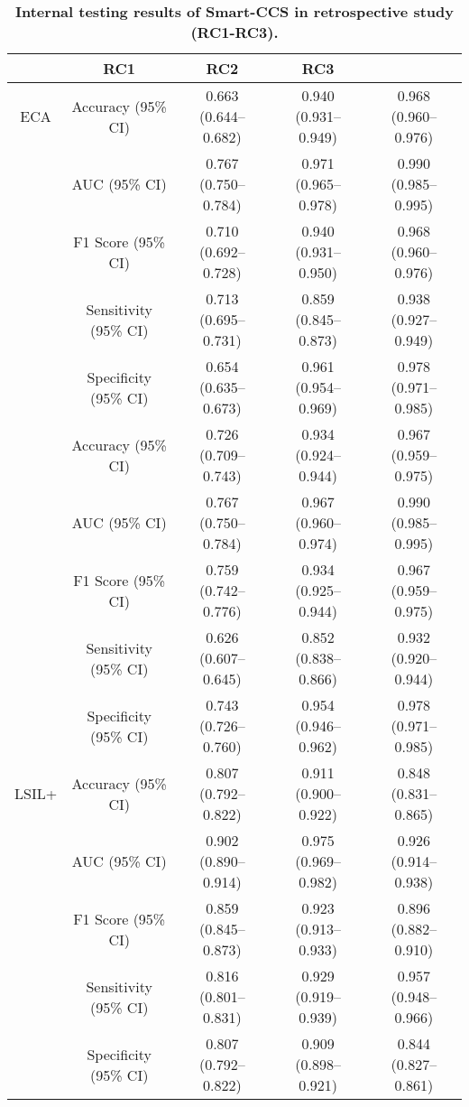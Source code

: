 \clearpage
\begin{table}[h] 
\renewcommand{\arraystretch}{2}
\renewcommand{\tablename}{Extended Data Table.}
\centering 
\caption{\textbf{Internal testing results of Smart-CCS in retrospective study (RC1-RC3).}}
\begin{tabular}{cc|c|c|c} 
\hline
\rowcolor{cusyellow} \multicolumn{2}{c|}{\multirow{1}{*}{\textbf{
 Metrics}}} & \textbf{RC1} & \textbf{RC2} & \textbf{RC3} \\ 
\hline
\multirow{1}{*}{ECA}&Accuracy (95\% CI) & 0.663 (0.644–0.682) & 0.940 (0.931–0.949) & 0.968 (0.960–0.976) \\
& AUC (95\% CI) & 0.767 (0.750–0.784) & 0.971 (0.965–0.978) & 0.990 (0.985–0.995) \\
& F1 Score (95\% CI) & 0.710 (0.692–0.728) & 0.940 (0.931–0.950) & 0.968 (0.960–0.976) \\
& Sensitivity (95\% CI) & 0.713 (0.695–0.731) & 0.859 (0.845–0.873) & 0.938 (0.927–0.949) \\
& Specificity (95\% CI) & 0.654 (0.635–0.673) & 0.961 (0.954–0.969) & 0.978 (0.971–0.985) \\

 \rowcolor{cusyellowl}  \multirow{1}{*}{ASC-US+ }&Accuracy (95\% CI) & 0.726 (0.709–0.743) & 0.934 (0.924–0.944) & 0.967 (0.959–0.975) \\
 \rowcolor{cusyellowl}  & AUC (95\% CI) & 0.767 (0.750–0.784) & 0.967 (0.960–0.974) & 0.990 (0.985–0.995)\\
 \rowcolor{cusyellowl}  & F1 Score (95\% CI)  & 0.759 (0.742–0.776) & 0.934 (0.925–0.944) & 0.967 (0.959–0.975)  \\
 \rowcolor{cusyellowl}  & Sensitivity (95\% CI) & 0.626 (0.607–0.645) & 0.852 (0.838–0.866) & 0.932 (0.920–0.944) \\
 \rowcolor{cusyellowl}  & Specificity (95\% CI)      & 0.743 (0.726–0.760) & 0.954 (0.946–0.962) & 0.978 (0.971–0.985) \\

\multirow{1}{*}{LSIL+}&Accuracy (95\% CI) & 0.807 (0.792–0.822) & 0.911 (0.900–0.922) & 0.848 (0.831–0.865) \\
& AUC (95\% CI) & 0.902 (0.890–0.914) & 0.975 (0.969–0.982) & 0.926 (0.914–0.938) \\
& F1 Score (95\% CI) & 0.859 (0.845–0.873) & 0.923 (0.913–0.933) & 0.896 (0.882–0.910)  \\
& Sensitivity (95\% CI) & 0.816 (0.801–0.831) & 0.929 (0.919–0.939) & 0.957 (0.948–0.966)  \\
& Specificity (95\% CI) & 0.807 (0.792–0.822) & 0.909 (0.898–0.921) & 0.844 (0.827–0.861) \\


\end{tabular}
\end{table}
